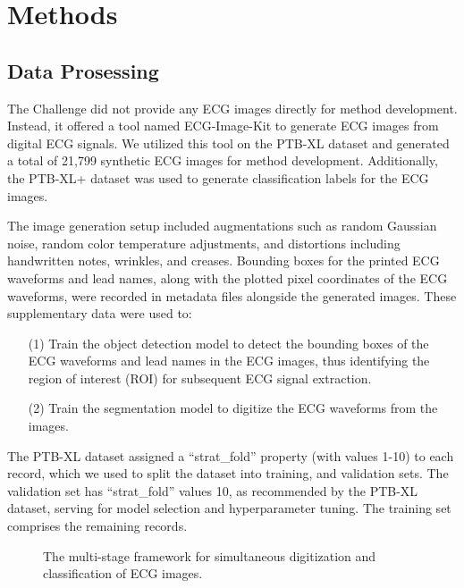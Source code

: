 \section{Methods}
\label{sec:methods}


\subsection{Data Prosessing}
\label{subsec:data_processing}


The Challenge did not provide any ECG images directly for method development. Instead, it offered a tool named ECG-Image-Kit \cite{Shivashankara_2024_ECG} to generate ECG images from digital ECG signals. We utilized this tool on the PTB-XL dataset \cite{wagner2020ptb_xl} and generated a total of 21,799 synthetic ECG images for method development. Additionally, the PTB-XL+ dataset \cite{Strodthoff_2023} was used to generate classification labels for the ECG images.

The image generation setup included augmentations such as random Gaussian noise, random color temperature adjustments, and distortions including handwritten notes, wrinkles, and creases. Bounding boxes for the printed ECG waveforms and lead names, along with the plotted pixel coordinates of the ECG waveforms, were recorded in metadata files alongside the generated images. These supplementary data were used to:
\begin{itemize}
\item[(1)] Train the object detection model to detect the bounding boxes of the ECG waveforms and lead names in the ECG images, thus identifying the region of interest (ROI) for subsequent ECG signal extraction.
\item[(2)] Train the segmentation model to digitize the ECG waveforms from the images.
\end{itemize}

The PTB-XL dataset assigned a ``strat\_fold'' property (with values 1-10) to each record, which we used to split the dataset into training, and validation sets. The validation set has ``strat\_fold'' values 10, as recommended by the PTB-XL dataset, serving for model selection and hyperparameter tuning. The training set comprises the remaining records.

\newif\ifFrameworkFigBox
\FrameworkFigBoxtrue

\begin{figure}[!ht]
\centering

\caption{The multi-stage framework for simultaneous digitization and classification of ECG images.}
\label{fig:multi-stage-framework}
\end{figure}

